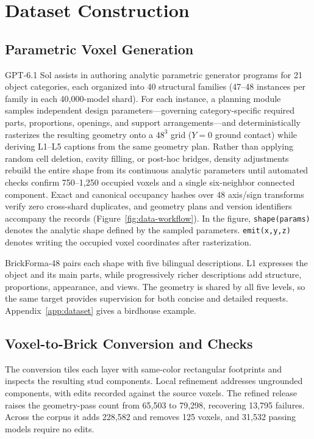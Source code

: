 \documentclass[letterpaper]{article} %
\begin{document}
\section{Dataset Construction}
\label{sec:dataset}
\subsection{Parametric Voxel Generation}
GPT-6.1 Sol assists in authoring analytic parametric generator programs for 21 object categories, each organized into 40 structural families (47--48 instances per family in each 40,000-model shard). For each instance, a planning module samples independent design parameters---governing category-specific required parts, proportions, openings, and support arrangements---and deterministically rasterizes the resulting geometry onto a $48^3$ grid ($Y{=}0$ ground contact) while deriving L1--L5 captions from the same geometry plan. Rather than applying random cell deletion, cavity filling, or post-hoc bridges, density adjustments rebuild the entire shape from its continuous analytic parameters until automated checks confirm 750--1,250 occupied voxels and a single six-neighbor connected component. Exact and canonical occupancy hashes over 48 axis/sign transforms verify zero cross-shard duplicates, and geometry plans and version identifiers accompany the records (Figure~\ref{fig:data-workflow}). %
In the figure, \texttt{shape(params)} denotes the analytic shape defined by the sampled parameters. \texttt{emit(x,y,z)} denotes writing the occupied voxel coordinates after rasterization.

BrickForma-48 pairs each shape with five bilingual descriptions. L1 expresses the object and its main parts, while progressively richer descriptions add structure, proportions, appearance, and views. The geometry is shared by all five levels, so the same target provides supervision for both concise and detailed requests. Appendix~\ref{app:dataset} gives a birdhouse example.

\subsection{Voxel-to-Brick Conversion and Checks}
The conversion tiles each layer with same-color rectangular footprints and inspects the resulting stud components. Local refinement addresses ungrounded components, %
 with edits recorded against the source voxels. The refined release raises the geometry-pass count from 65,503 to 79,298, recovering 13,795 failures. Across the corpus it adds 228,582 and removes 125 voxels, and 31,532 passing models require no edits.
\end{document}
